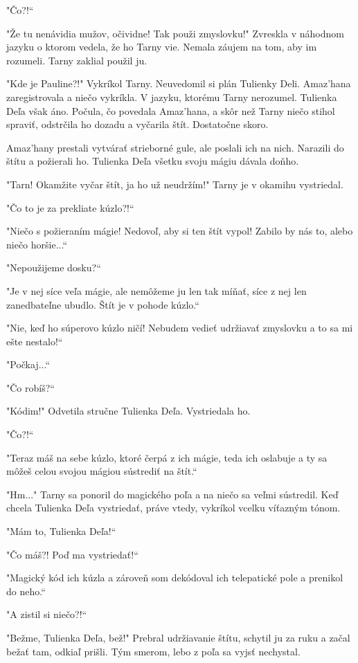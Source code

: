 \documentclass{book}
\begin{document}
"$ $Čo?!“

"$ $Že tu nenávidia mužov, očividne! Tak použi zmyslovku!"$ $ Zvreskla v náhodnom jazyku o ktorom vedela, že ho Tarny vie. Nemala záujem na tom, aby im rozumeli. Tarny zaklial použil ju.

"$ $Kde je Pauline?!"$ $ Vykríkol Tarny. Neuvedomil si plán Tulienky Deli. Amaz'hana zaregistrovala a niečo vykríkla. V jazyku, ktorému Tarny nerozumel. Tulienka Deľa však áno. Počula, čo povedala Amaz'hana, a skôr než Tarny niečo stihol spraviť, odstrčila ho dozadu a vyčarila štít. Dostatočne skoro.

Amaz'hany prestali vytvárať strieborné gule, ale poslali ich na nich. Narazili do štítu a požierali ho. Tulienka Deľa všetku svoju mágiu dávala doňho.

"$ $Tarn! Okamžite vyčar štít, ja ho už neudržím!"$ $ Tarny je v okamihu vystriedal.

"$ $Čo to je za prekliate kúzlo?!“

"$ $Niečo s požieraním mágie! Nedovoľ, aby si ten štít vypol! Zabilo by nás to, alebo niečo horšie...“

"$ $Nepoužijeme dosku?“

"$ $Je v nej síce veľa mágie, ale nemôžeme ju len tak míňať, síce z nej len zanedbateľne ubudlo. Štít je v pohode kúzlo.“

"$ $Nie, keď ho súperovo kúzlo ničí! Nebudem vedieť udržiavať zmyslovku a to sa mi ešte nestalo!“

"$ $Počkaj...“

"$ $Čo robíš?“

"$ $Kódim!"$ $ Odvetila stručne Tulienka Deľa. Vystriedala ho.

"$ $Čo?!“

"$ $Teraz máš na sebe kúzlo, ktoré čerpá z ich mágie, teda ich oslabuje a ty sa môžeš celou svojou mágiou sústrediť na štít.“

"$ $Hm..."$ $ Tarny sa ponoril do magického poľa a na niečo sa veľmi sústredil. Keď chcela Tulienka Deľa vystriedať, práve vtedy, vykríkol vcelku víťazným tónom.

"$ $Mám to, Tulienka Deľa!“

"$ $Čo máš?! Poď ma vystriedať!“

"$ $Magický kód ich kúzla a zároveň som dekódoval ich telepatické pole a prenikol do neho.“

"$ $A zistil si niečo?!“

"$ $Bežme, Tulienka Deľa, bež!"$ $ Prebral udržiavanie štítu, schytil ju za ruku a začal bežať tam, odkiaľ prišli. Tým smerom, lebo z poľa sa vyjsť nechystal.
\end{document}
